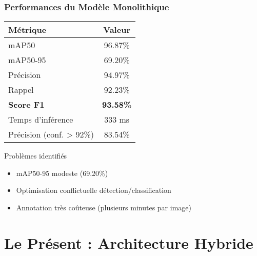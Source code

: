 \documentclass[
	11pt,
	aspectratio=169,
]{beamer}
\begin{document}
\begin{frame}
	\frametitle{Performances du Modèle Monolithique}
	
	\begin{table}
		\centering
		\begin{tabular}{lc}
			\toprule
			\textbf{Métrique} & \textbf{Valeur} \\
			\midrule
			mAP50 & 96.87\% \\
			mAP50-95 & 69.20\% \\
			Précision & 94.97\% \\
			Rappel & 92.23\% \\
			\textbf{Score F1} & \textbf{93.58\%} \\
			Temps d'inférence & 333 ms \\
			Précision (conf. > 92\%) & 83.54\% \\
			\bottomrule
		\end{tabular}
	\end{table}
	
	\bigskip
	
	\begin{alertblock}{Problèmes identifiés}
		\begin{itemize}
			\item mAP50-95 modeste (69.20\%)
			\item Optimisation conflictuelle détection/classification
			\item Annotation très coûteuse (plusieurs minutes par image)
		\end{itemize}
	\end{alertblock}
\end{frame}


\section{Le Présent : Architecture Hybride}
\end{document}
